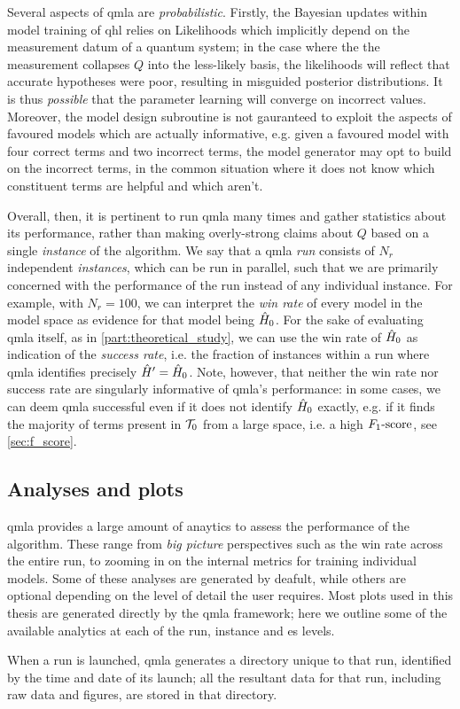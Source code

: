 Several aspects of \gls{qmla} are \emph{probabilistic}.
Firstly, the Bayesian updates within model training of \gls{qhl} relies on Likelihoods which 
    implicitly depend on the measurement datum of a quantum system; 
    in the case where the the measurement collapses $Q$ into the less-likely basis, 
    the likelihoods will reflect that accurate hypotheses were poor, 
    resulting in misguided posterior distributions. 
It is thus \emph{possible} that the parameter learning will converge on incorrect values. 
Moreover, the model design subroutine is not gauranteed to exploit the aspects of favoured models which are 
    actually informative, e.g. given a favoured model with four correct terms and two incorrect terms, 
    the model generator may opt to build on the incorrect terms, in the common situation where it does not know 
    which constituent terms are helpful and which aren't. 
\par 
Overall, then, it is pertinent to run \gls{qmla} many times and gather statistics about its performance, 
    rather than making overly-strong claims about $Q$ based on a single \emph{instance} of the algorithm. 
We say that a \gls{qmla} \emph{\gls{run}} consists of $N_r$ independent \emph{\glspl{instance}},
    which can be run in parallel, such that we are primarily concerned with the performance of the run 
    instead of any individual instance. 
For example, with $N_r=100$, we can interpret the \emph{\gls{win rate}} of every model in the model space
    as evidence for that model being $\hat{H}_0$.
For the sake of evaluating \gls{qmla} itself, as in \cref{part:theoretical_study}, 
    we can use the \gls{win rate} of $\hat{H}_0$ as indication of the \emph{\gls{success rate}}, 
    i.e. the fraction of instances within a run where \gls{qmla} identifies precisely $\hat{H}^{\prime} = \hat{H}_0$. 
Note, however, that neither the \gls{win rate} nor \gls{success rate} are singularly informative 
    of \gls{qmla}'s performance: in some cases, we can deem \gls{qmla} successful even if it does not 
    identify $\hat{H}_0$ exactly, e.g. if it finds the majority of terms present in ${ \mathcal{T} }_0$ from a large space, 
    i.e. a high $ F_{1}\text{-score} $, see \cref{sec:f_score}. 


\subsection{Analyses and plots}
\gls{qmla} provides a large amount of anaytics to assess the performance of the algorithm. 
These range from \emph{big picture} perspectives such as the \gls{win rate} across the entire \gls{run}, 
    to zooming in on the internal metrics for training individual models.
Some of these analyses are generated by deafult, while others are optional depending on the 
    level of detail the user requires. 
Most plots used in this thesis are generated directly by the \gls{qmla} framework; 
    here we outline some of the available analytics at each of the \gls{run}, \gls{instance} and \gls{es} levels.
\par 
When a \gls{run} is launched, \gls{qmla} generates a directory unique to that \gls{run}, 
    identified by the time and date of its launch; 
    all the resultant data for that \gls{run}, including raw data and figures, are stored in that directory. 

